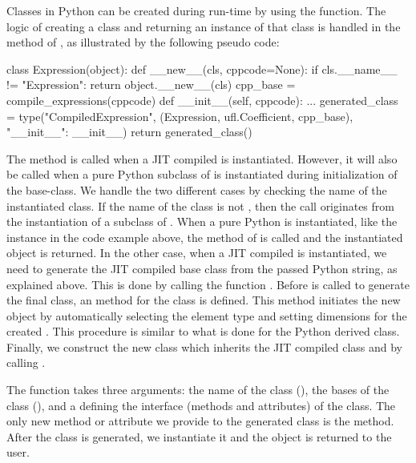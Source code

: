 Classes in Python can be created during run-time by using the
 function. The logic of creating a class and returning an
instance of that class is handled in the  method of
, as illustrated by the following pseudo code:
\vspace*{16pt}\begin{python}
class Expression(object):
    def __new__(cls, cppcode=None):
        if cls.__name__ != "Expression":
            return object.__new__(cls)
        cpp_base = compile_expressions(cppcode)
        def __init__(self, cppcode):
            ...
        generated_class = type("CompiledExpression",
                               (Expression, ufl.Coefficient, cpp_base),
                               {"__init__": __init__})
        return generated_class()
\end{python}
The  method is called when a JIT compiled
 is instantiated. However, it will also be called when
a pure Python subclass of  is instantiated during
initialization of the base-class. We handle the two different cases by
checking the name of the instantiated class. If the name of the class
is not , then the call originates from the
instantiation of a subclass of . When a pure Python
 is instantiated, like the  instance in
the code example above, the  method of 
is called and the instantiated object is returned.  In the other case,
when a JIT compiled  is instantiated, we need to
generate the JIT compiled base class from the passed Python string, as
explained above. This is done by calling the function
. Before  is called to generate
the final class, an  method for the class is
defined. This method initiates the new object by automatically
selecting the element type and setting dimensions for the created
. This procedure is similar to what is done for the
Python derived  class. Finally, we construct the new
class which inherits the JIT compiled class and 
by calling .

The  function takes three arguments: the name of the class
(), the bases of the class (), and a  defining the
interface (methods and attributes) of the class. The only new method or
attribute we provide to the generated class is the 
method. After the class is generated, we instantiate it and the object
is returned to the user.

